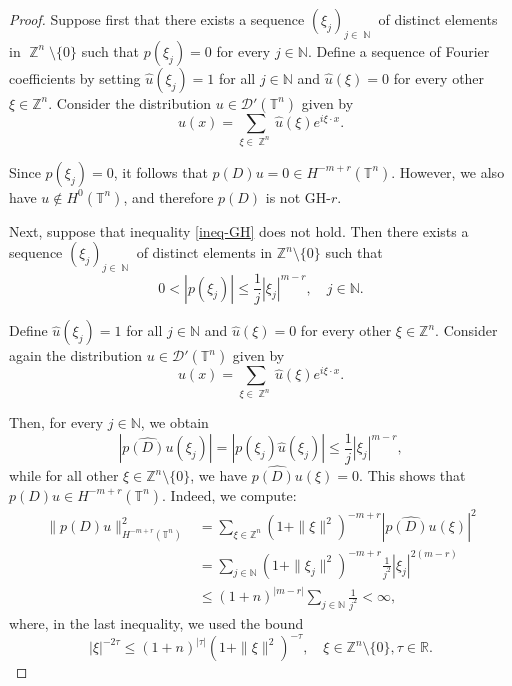 \documentclass[11pt]{amsart}
\numberwithin{equation}{section}
\theoremstyle{definition}
\DeclareMathOperator{\Z}{\mathbb{Z}}
\DeclareMathOperator{\N}{\mathbb{N}}
\begin{document}
\begin{proof}
	Suppose first that there exists a sequence \( (\xi_j)_{j\in\N} \) of distinct elements in \( \Z^n\setminus\{0\} \) such that \( p(\xi_j) = 0 \) for every \( j \in \mathbb{N} \). Define a sequence of Fourier coefficients by setting \( \widehat{u}(\xi_j) = 1 \) for all \( j \in \mathbb{N} \) and \( \widehat{u}(\xi) = 0 \) for every other \( \xi \in \mathbb{Z}^n \). Consider the distribution \( u \in \mathscr{D}'(\mathbb{T}^n) \) given by  
	\[
	u(x) = \sum_{\xi\in\Z^n} \widehat{u}(\xi) e^{i\xi\cdot x}.
	\]
	
	Since \( p(\xi_j) = 0 \), it follows that \( p(D)u = 0 \in H^{-m+r}(\mathbb{T}^n) \). However, we also have \( u \notin H^0(\mathbb{T}^n) \), and therefore \( p(D) \) is not GH-\( r \).
	
	\medskip
	Next, suppose that inequality \eqref{ineq-GH} does not hold. Then there exists a sequence \( (\xi_j)_{j\in\N} \) of distinct elements in \( \mathbb{Z}^n \setminus \{0\} \) such that  
	\[
	0 < |p(\xi_j)| \leq  \frac{1}{j} |\xi_j|^{m-r}, \quad j \in \mathbb{N}.
	\]
	
	Define \( \widehat{u}(\xi_j) = 1 \) for all \( j \in \mathbb{N} \) and \( \widehat{u}(\xi) = 0 \) for every other \( \xi \in \mathbb{Z}^n \). Consider again the distribution \( u \in \mathscr{D}'(\mathbb{T}^n) \) given by  
	\[
	u(x) = \sum_{\xi\in\Z^n} \widehat{u}(\xi) e^{i\xi\cdot x}.
	\]
	
	Then, for every \( j \in \mathbb{N} \), we obtain
	\begin{equation*}
		|\widehat{p(D)u}(\xi_j)| = |p(\xi_j)\widehat{u}(\xi_j)| \leq \frac{1}{j} |\xi_j|^{m-r},
	\end{equation*}
	while for all other \( \xi \in \mathbb{Z}^n \setminus \{0\} \), we have \( \widehat{p(D)u}(\xi) = 0 \). This shows that \( p(D)u \in H^{-m+r}(\mathbb{T}^n) \). Indeed, we compute:
	\begin{align*}
		\|p(D)u\|_{H^{-m+r}(\mathbb{T}^n)}^2
		&= \sum_{\xi \in \mathbb{Z}^n} (1+\|\xi\|^2)^{-m+r} |\widehat{p(D)u}(\xi)|^2 \\
		&= \sum_{j \in \mathbb{N}} (1+\|\xi_j\|^2)^{-m+r} \frac{1}{j^2} |\xi_j|^{2(m-r)} \\
		&\leq (1+n)^{|m-r|} \sum_{j \in \mathbb{N}} \frac{1}{j^2} < \infty,
	\end{align*}
	where, in the last inequality, we used the bound  
	\[
	|\xi|^{-2\tau} \leq (1+n)^{|\tau|} (1+\|\xi\|^2)^{-\tau}, \quad \xi \in \mathbb{Z}^n \setminus \{0\},  \tau \in \mathbb{R}.
	\]
	

\end{proof}
\end{document}
